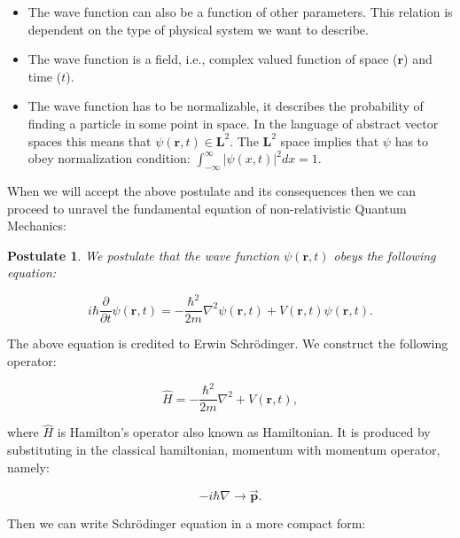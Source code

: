 \documentclass[a4paper,oneside,openright,11pt]{book}
\newtheorem{theorem}{Postulate}
\begin{document}
\begin{itemize}
    \item The wave function can also be a function of other parameters. This relation is dependent on the type of physical system we want to describe.
    \item The wave function is a field, i.e., complex valued function of space ($\textbf{r}$) and time ($t$).
    \item The wave function has to be normalizable, it describes the probability of finding a particle in some point in space. In the language of abstract vector spaces this means that $\psi(\textbf{r}, t) \in \textbf{L}^{2}$\cite{L2}. The $\textbf{L}^{2}$ space implies that $\psi$ has to obey normalization condition: $\int_{-\infty}^{\infty} \lvert \psi(x, t) \rvert^{2}dx = 1$. 
\end{itemize}

When we will accept the above postulate and its consequences then we can proceed to unravel the fundamental equation of non-relativistic Quantum Mechanics: 


\begin{theorem}
We postulate that the wave function $\psi(\textbf{r}, t)$ obeys the following equation:

\begin{equation}
    i \hbar \frac{\partial}{\partial t} \psi(\textbf{r}, t) = - \frac{\hbar^2}{2m} \nabla^{2} \psi(\textbf{r}, t) + V(\textbf{r}, t)\psi(\textbf{r}, t).
\end{equation}

\end{theorem}

The above equation is credited to Erwin Schrödinger. We construct the following operator:

\begin{equation}
    \hat{H} = - \frac{\hbar^2}{2m}\nabla^{2} + V(\textbf{r}, t),
\end{equation}

\noindent
where $\hat{H}$ is Hamilton's operator also known as Hamiltonian. It is produced by substituting in the classical hamiltonian, momentum with momentum operator, namely:

\begin{equation}
    -i \hbar \nabla \rightarrow \overrightarrow{\textbf{p}}.
\end{equation}



Then we can write Schrödinger equation in a more compact form\cite{kryszewski}:
\end{document}
